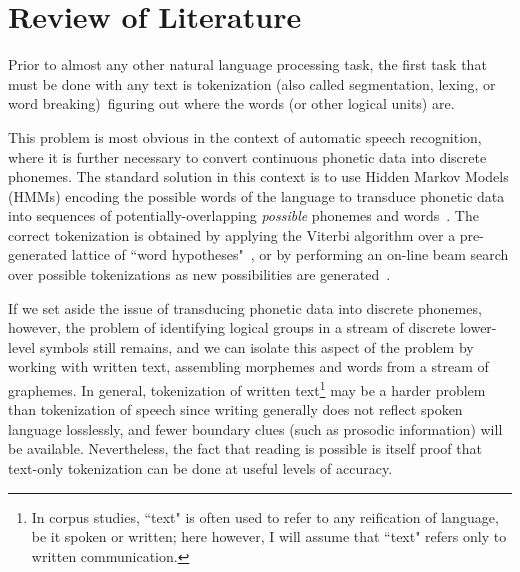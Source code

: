 \chapter{Review of Literature}

Prior to almost any other natural language processing task, the first task that must be done with any text is tokenization (also called segmentation, lexing, or word breaking)\textemdash~figuring out where the words (or other logical units) are. 

This problem is most obvious in the context of automatic speech recognition, where it is further necessary to convert continuous phonetic data into discrete phonemes. The standard solution in this context is to use Hidden Markov Models (HMMs) encoding the possible words of the language to transduce phonetic data into sequences of potentially-overlapping \textit{possible} phonemes and words~\cite{varile97}. The correct tokenization is obtained by applying the Viterbi algorithm over a pre-generated lattice of ``word hypotheses"~\cite{aubert94}, or by performing an on-line beam search over possible tokenizations as new possibilities are generated~\cite{paul94}.


If we set aside the issue of transducing phonetic data into discrete phonemes, however, the problem of identifying logical groups in a stream of discrete lower-level symbols still remains, and we can isolate this aspect of the problem by working with written text, assembling morphemes and words from a stream of graphemes. In general, tokenization of written text\footnote{In corpus studies, ``text" is often used to refer to any reification of language, be it spoken or written; here however, I will assume that ``text" refers only to written communication.} may be a harder problem than tokenization of speech since writing generally does not reflect spoken language losslessly, and fewer boundary clues (such as prosodic information) will be available. Nevertheless, the fact that reading is possible is itself proof that text-only tokenization can be done at useful levels of accuracy.


